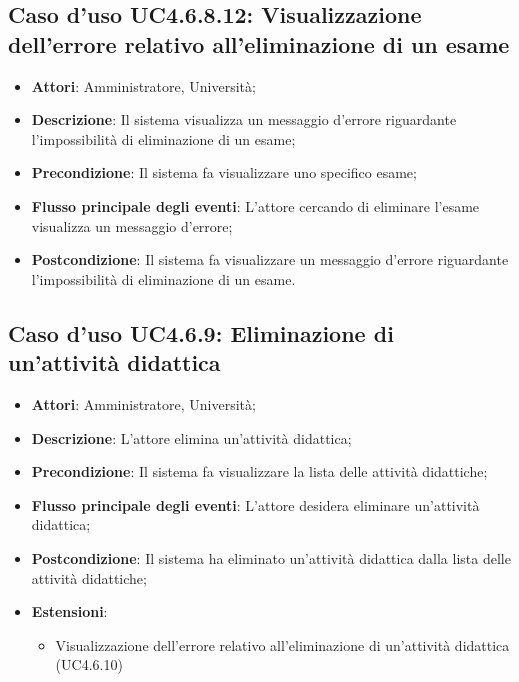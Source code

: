 \subsection{Caso d'uso \texorpdfstring{UC4.6.8.12}{UC4.6.8.12}: Visualizzazione dell'errore relativo all'eliminazione di un esame}
\begin{itemize}
\item \textbf{Attori}: Amministratore, Università;
\item \textbf{Descrizione}: Il sistema visualizza un messaggio d'errore riguardante l'impossibilità di eliminazione di un esame;
\item \textbf{Precondizione}: Il sistema fa visualizzare uno specifico esame;

\item \textbf{Flusso principale degli eventi}: L'attore cercando di eliminare l'esame visualizza un messaggio d'errore;
\item \textbf{Postcondizione}: Il sistema fa visualizzare un messaggio d'errore riguardante l'impossibilità di eliminazione di un esame.
\end{itemize}
\subsection{Caso d'uso \texorpdfstring{UC4.6.9}{UC4.6.9}: Eliminazione di un'attività didattica}
\begin{itemize}
\item \textbf{Attori}: Amministratore, Università;
\item \textbf{Descrizione}: L'attore elimina un'attività didattica;

\item \textbf{Precondizione}: Il sistema fa visualizzare la lista delle attività didattiche;

\item \textbf{Flusso principale degli eventi}: L'attore desidera eliminare un'attività didattica;

\item \textbf{Postcondizione}: Il sistema ha eliminato un'attività didattica dalla lista delle attività didattiche;

\item \textbf{Estensioni}:
\begin{itemize}
\item Visualizzazione dell'errore relativo all'eliminazione di un'attività didattica (UC4.6.10)
\end{itemize}
\end{itemize}
